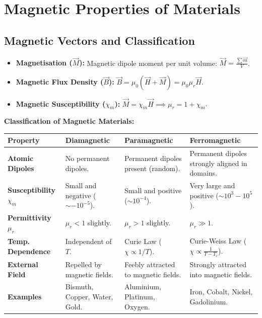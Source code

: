 \documentclass[12pt,a4paper]{article}
\begin{document}
\section{Magnetic Properties of Materials}

\subsection{Magnetic Vectors and Classification}

\begin{tcolorbox}[formulabox, title={\textbf{Magnetic Field Relations}}]
\begin{itemize}[leftmargin=*, itemsep=3pt]
  \item \textbf{Magnetisation ($\vec{M}$):} Magnetic dipole moment per unit volume: $\vec{M} = \frac{\sum \vec{m}}{V}$.
  \item \textbf{Magnetic Flux Density ($\vec{B}$):} $\vec{B} = \mu_0 (\vec{H} + \vec{M}) = \mu_0 \mu_r \vec{H}$.
  \item \textbf{Magnetic Susceptibility ($\chi_m$):} $\vec{M} = \chi_m \vec{H} \implies \mu_r = 1 + \chi_m$.
\end{itemize}
\end{tcolorbox}

\textbf{Classification of Magnetic Materials:}\par\vspace{6pt}\noindent
\begin{tabularx}{\linewidth}{|B{3.0cm}|Y|Y|Y|}
\hline
\textbf{Property} & \textbf{Diamagnetic} & \textbf{Paramagnetic} & \textbf{Ferromagnetic} \\
\hline
\textbf{Atomic Dipoles} & No permanent dipoles. & Permanent dipoles present (random). & Permanent dipoles strongly aligned in domains. \\
\hline
\textbf{Susceptibility $\chi_m$} & Small and negative ($\sim -10^{-5}$). & Small and positive ($\sim 10^{-4}$). & Very large and positive ($\sim 10^3 - 10^5$). \\
\hline
\textbf{Permittivity $\mu_r$} & $\mu_r < 1$ slightly. & $\mu_r > 1$ slightly. & $\mu_r \gg 1$. \\
\hline
\textbf{Temp. Dependence} & Independent of $T$. & Curie Law ($\chi \propto 1/T$). & Curie-Weiss Law ($\chi \propto \frac{1}{T - T_c}$). \\
\hline
\textbf{External Field} & Repelled by magnetic fields. & Feebly attracted to magnetic fields. & Strongly attracted into magnetic fields. \\
\hline
\textbf{Examples} & Bismuth, Copper, Water, Gold. & Aluminium, Platinum, Oxygen. & Iron, Cobalt, Nickel, Gadolinium. \\
\hline
\end{tabularx}
\end{document}
